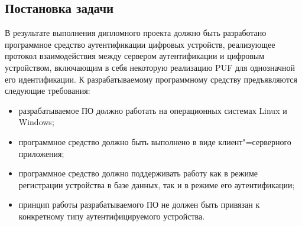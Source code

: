 \subsection{Постановка задачи}
В результате выполнения дипломного проекта должно быть разработано программное средство аутентификации цифровых устройств, реализующее протокол взаимодействия между сервером аутентификации и цифровым устройством, включающим в себя некоторую реализацию PUF для однозначной его идентификации. К разрабатываемому программному средству предъявляются следующие требования:
\begin{itemize}
\item разрабатываемое ПО должно работать на операционных системах Linux и Windows;
\item программное средство должно быть выполнено в виде клиент"=серверного приложения;
\item программное средство должно поддерживать работу как в режиме регистрации устройства в базе данных, так и в режиме его аутентификации;
\item принцип работы разрабатываемого ПО не должен быть привязан к конкретному типу аутентифицируемого устройства.
\end{itemize}
